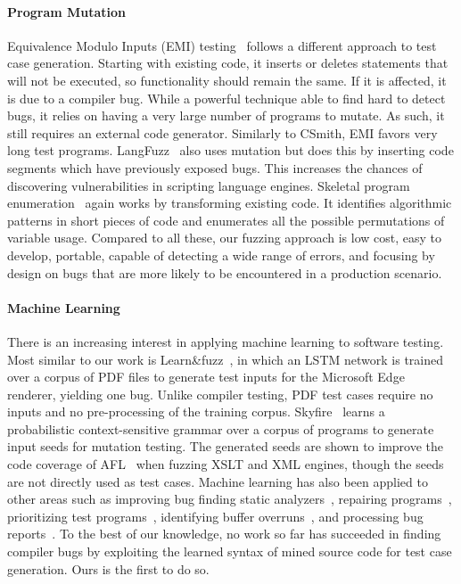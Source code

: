 \paragraph{Program Mutation}

Equivalence Modulo Inputs (EMI) testing~\cite{Le2013a,Sun2016a} follows a
different approach to test case generation. Starting with existing code, it
inserts or deletes statements that will not be executed, so functionality should
remain the same. If it is affected, it is due to a compiler bug. While a
powerful technique able to find hard to detect bugs, it relies on having a very
large number of programs to mutate. As such, it still requires an external code
generator. Similarly to CSmith, EMI favors very long test programs.
LangFuzz~\cite{Holler2012} also uses mutation but does this by inserting code
segments which have previously exposed bugs. This increases the chances of
discovering vulnerabilities in scripting language engines. Skeletal program
enumeration~\cite{Zhang2017a} again works by transforming existing code. It
identifies algorithmic patterns in short pieces of code and enumerates all the
possible permutations of variable usage. Compared to all these, our fuzzing
approach is low cost, easy to develop, portable, capable of detecting a wide
range of errors, and focusing by design on bugs that are more likely to be
encountered in a production scenario.

\paragraph{Machine Learning}

There is an increasing interest in applying machine learning to software
testing. Most similar to our work is Learn\&fuzz~\cite{Godefroid2017}, in which
an LSTM network is trained over a corpus of PDF files to generate test inputs
for the Microsoft Edge renderer, yielding one bug. Unlike compiler testing, PDF
test cases require no inputs and no pre-processing of the training corpus.
Skyfire~\cite{Wang2017c} learns a probabilistic context-sensitive grammar over a
corpus of programs to generate input seeds for mutation testing. The generated
seeds are shown to improve the code coverage of AFL~\cite{Zalewski} when fuzzing
XSLT and XML engines, though the seeds are not directly used as test cases.
Machine learning has also been applied to other areas such as improving bug
finding static analyzers~\cite{Heo2017,Koc2017}, repairing
programs~\cite{Koukoutos2017a,White}, prioritizing test
programs~\cite{Chen2017}, identifying buffer overruns~\cite{Choi2016}, and
processing bug reports~\cite{Lam2016,Huo2016}. To the best of our knowledge, no
work so far has succeeded in finding compiler bugs by exploiting the learned
syntax of mined source code for test case generation. Ours is the first to do
so.


